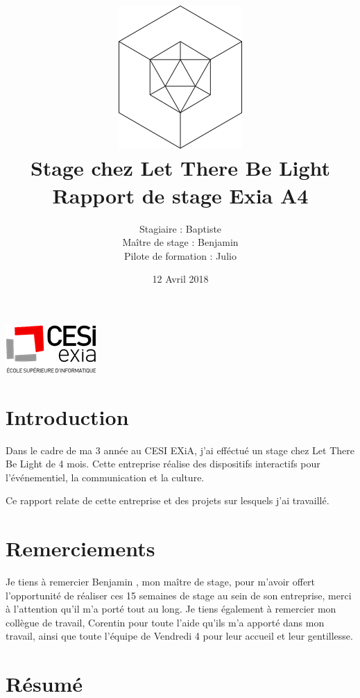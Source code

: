 \documentclass{article}
\title{\includegraphics{img/logo.png}\vspace{2cm}\\
    Stage chez Let There Be Light \\
    \large Rapport de stage Exia A4}
\date{12 Avril 2018}
\author{Stagiaire : Baptiste \bsc{Saclier} \\
    Maître de stage : Benjamin \bsc{Petit}\\
    Pilote de formation : Julio \bsc{Santilario}}
\begin{document}
    \maketitle
    \vspace{\fill}
    \hspace{\fill}\includegraphics{img/exia.png}

    \clearpage

    \tableofcontents

    \section{Introduction}

    Dans le cadre de ma 3 année au CESI EXiA, j'ai efféctué un stage chez Let There Be Light de 4 mois.
    Cette entreprise réalise des dispositifs interactifs pour l'événementiel, la communication et la culture.

    Ce rapport relate de cette entreprise et des projets sur lesquels j'ai travaillé.

    \clearpage

    \section{Remerciements}

    \vspace{\fill}

    Je tiens à remercier Benjamin , mon maître de stage, pour m'avoir offert l'opportunité de réaliser ces 15 semaines de stage au sein de son entreprise, merci à l'attention qu'il m'a porté tout au long.
    Je tiens également à remercier mon collègue de travail, Corentin  pour toute l'aide qu'ils m'a apporté dans mon travail, ainsi que toute l'équipe de Vendredi 4 pour leur accueil et leur gentillesse.

    \vspace{\fill}

    \clearpage

    \section{Résumé}

\end{document}
